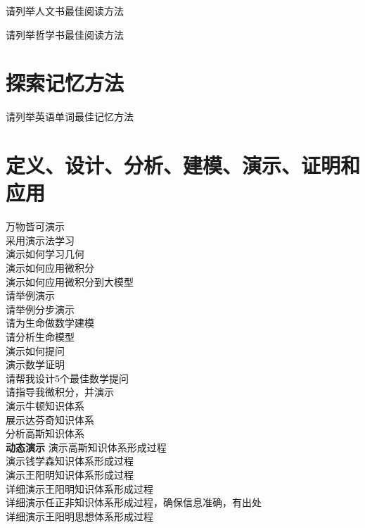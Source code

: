 \documentclass[12pt]{book}
\begin{document}
请列举人文书最佳阅读方法

请列举哲学书最佳阅读方法


\section{探索记忆方法}

请列举英语单词最佳记忆方法

\section{定义、设计、分析、建模、演示、证明和应用}	
万物皆可演示\\
采用演示法学习\\

演示如何学习几何\\
演示如何应用微积分\\
演示如何应用微积分到大模型\\


请举例演示\\
请举例分步演示\\
请为生命做数学建模\\
请分析生命模型\\
演示如何提问\\
演示数学证明\\
请帮我设计5个最佳数学提问\\
请指导我微积分，并演示\\


演示牛顿知识体系\\
展示达芬奇知识体系\\
分析高斯知识体系\\

\textbf{动态演示}
演示高斯知识体系形成过程\\
演示钱学森知识体系形成过程\\
演示王阳明知识体系形成过程\\
详细演示王阳明知识体系形成过程\\
详细演示任正非知识体系形成过程，确保信息准确，有出处\\

详细演示王阳明思想体系形成过程\\
\end{document}
